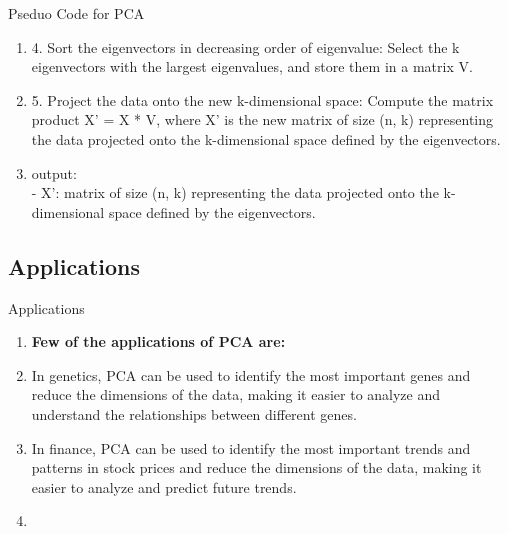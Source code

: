 \documentclass{beamer}
\begin{document}
\begin{frame}{Pseduo Code for PCA}
    \begin{enumerate}
        \item 4. Sort the eigenvectors in decreasing order of eigenvalue: Select the k eigenvectors with the largest eigenvalues, and store them in a matrix V.
        \item 5. Project the data onto the new k-dimensional space: Compute the matrix product X' = X * V, where X' is the new matrix of size (n, k) representing the data projected onto the k-dimensional space defined by the eigenvectors.
        \item output:\\
              - X': matrix of size (n, k) representing the data projected onto the k-dimensional space defined by the eigenvectors.

    \end{enumerate}
\end{frame}

\subsection{Applications}
\begin{frame}{Applications}
    \begin{enumerate}
        \item \textbf{Few of the applications of PCA are:}
        \item In genetics, PCA can be used to identify the most important genes and reduce the dimensions of the data, making it easier to analyze and understand the relationships between different genes.
        \item In finance, PCA can be used to identify the most important trends and patterns in stock prices and reduce the dimensions of the data, making it easier to analyze and predict future trends.
        \item 
    \end{enumerate}
\end{frame}
\end{document}

